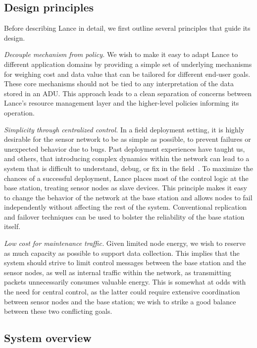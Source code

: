\subsection{Design principles}

Before describing Lance in detail, we first outline several principles 
that guide its design. 

{\em Decouple mechanism from policy.}
We wish to make it easy to adapt Lance to different application
domains by providing a simple set of underlying mechanisms for 
weighing cost and data value that can be tailored 
for different
end-user goals. These core mechanisms should not be tied to any
interpretation of the data stored in an ADU. This approach leads 
to a clean separation of concerns between Lance's resource management
layer and the higher-level policies informing its operation.

{\em Simplicity through centralized control.} In a field deployment setting, 
it is highly desirable for the sensor network to be as simple
as possible, to prevent failures or unexpected behavior due to bugs.
Past deployment experiences have taught us, and others, that 
introducing complex dynamics within the network can lead to a system
that is difficult to understand, debug, or fix in the
field~\cite{volcano-osdi06,volcano-ewsn05}.
To maximize the chances of a successful deployment, 
Lance places most of the control
logic at the base station, treating sensor nodes as slave devices.
This principle makes it easy to change the behavior of the network
at the base station and allows nodes to fail independently without 
affecting the rest of the system. Conventional replication and
failover techniques can be used to bolster the reliability of the 
base station itself.

{\em Low cost for maintenance traffic.} Given limited node energy, 
we wish to reserve as much capacity as possible to support
data collection. This implies that the system
should strive to limit control messages between the base station and
the sensor nodes, as well as internal traffic within the network, as
transmitting packets unnecessarily consumes valuable energy.
This is somewhat at odds with the need for central control,
as the latter could require extensive coordination between 
sensor nodes and the base station; we wish to strike a good balance
between these two conflicting goals.

\subsection{System overview}

